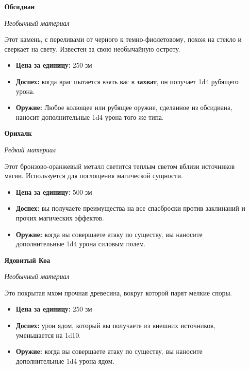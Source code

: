 \documentclass[a4paper, 9pt, twocolumn]{book}
\begin{document}
	\noindent \textbf{Обсидиан}
	
	\noindent \textit{Необычный материал}
	
	\smallskip 
	
	\noindent Этот камень, с переливами от черного к темно-фиолетовому, похож на стекло и сверкает на свету. Известен за свою необычайную остроту.
	
	\begin{itemize}
		\item \textbf{Цена за единицу:} 250 зм
		
		\item \textbf{Доспех:} когда враг пытается взять вас в \textbf{захват}, он получает 1d4 рубящего урона.
		
		\item \textbf{Оружие:} Любое колющее или рубящее оружие, сделанное из обсидиана, наносит дополнительные 1d4 урона того же типа. 
	\end{itemize}

	\noindent \textbf{Орихалк}
	
	\noindent \textit{Редкий материал}
	
	\smallskip 
	
	\noindent Этот бронзово-оранжевый металл светится теплым светом вблизи источников магии. Используется для поглощения магической сущности.
	
	\begin{itemize}
		\item \textbf{Цена за единицу:} 500 зм
		
		\item \textbf{Доспех:} вы получаете преимущества на все спасброски против заклинаний и прочих магических эффектов.
		
		\item \textbf{Оружие:} когда вы совершаете атаку по существу, вы наносите дополнительные 1d4 урона силовым полем. 
	\end{itemize}

	\noindent \textbf{Ядовитый Коа}
	
	\noindent \textit{Необычный материал}
	
	\smallskip
	
	\noindent Это покрытая мхом прочная древесина, вокруг которой парят мелкие споры.
	
	\begin{itemize}
		\item \textbf{Цена за единицу:} 250 зм
		
		\item \textbf{Доспех:} урон ядом, который вы получаете из внешних источников, уменьшается на 1d10.
		
		\item \textbf{Оружие:} когда вы совершаете атаку по существу, вы наносите дополнительные 1d4 урона ядом.
	\end{itemize}
\end{document}
